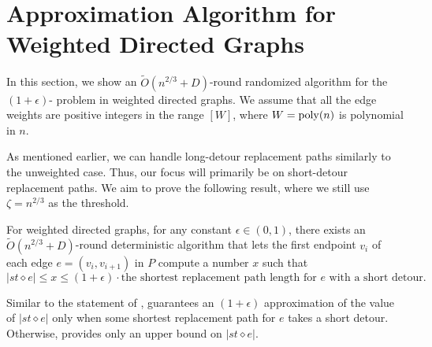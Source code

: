 \section{Approximation Algorithm for Weighted Directed Graphs}
\label{sec:wapprox}

In this section, we show an $\widetilde{O}(n^{2/3}+D)$-round randomized algorithm for the $(1+\epsilon)$-\apxrpath{} problem in weighted directed graphs. We assume that all the edge weights are positive integers in the range $[W]$, where $W = \operatorname{poly}(n)$ is polynomial in $n$. 



As mentioned earlier, we can handle long-detour replacement paths similarly to the unweighted case. Thus, our focus will primarily be on short-detour replacement paths. We aim to prove the following result, where we still use $\zeta = n^{2/3}$ as the threshold.


\begin{proposition}\label{approx_short}
    For weighted directed graphs, for any constant $\epsilon \in (0,1)$, there exists an $\widetilde{O}(n^{2/3}+D)$-round deterministic algorithm that lets the first endpoint $v_i$ of each edge $e=(v_i, v_{i+1})$ in $P$ compute a number $x$ such that
    \[|st \diamond e| \leq x \leq (1+\epsilon) \cdot \text{the shortest replacement path length for $e$ with a short detour}.\] 
\end{proposition}

Similar to the statement of ,  guarantees an $(1+\epsilon)$ approximation of the value of $|st \diamond e|$ only when some shortest replacement path for $e$ takes a short detour. Otherwise,  provides only an upper bound on $|st \diamond e|$. 

